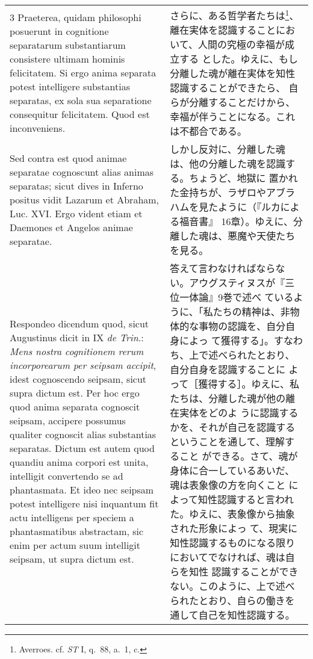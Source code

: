\documentclass[10pt]{jsarticle} %
\begin{document}
\begin{longtable}{p{21em}p{21em}}
\\


3 {\sc Praeterea}, quidam philosophi posuerunt in cognitione
separatarum substantiarum consistere ultimam hominis felicitatem. Si
ergo anima separata potest intelligere substantias separatas, ex sola
sua separatione consequitur felicitatem. Quod est inconveniens.

&

さらに、ある哲学者たちは\footnote{Averroes. cf. {\it ST} I, q.~88,
a.~1, c.}、離在実体を認識することにおいて、人間の究極の幸福が成立する
とした。ゆえに、もし分離した魂が離在実体を知性認識することができたら、
自らが分離することだけから、幸福が伴うことになる。これは不都合である。

\\


{\sc Sed contra est} quod animae separatae cognoscunt alias animas
separatas; sicut dives in Inferno positus vidit Lazarum et Abraham,
Luc. XVI. Ergo vident etiam et Daemones et Angelos animae separatae.

&

しかし反対に、分離した魂は、他の分離した魂を認識する。ちょうど、地獄に
置かれた金持ちが、ラザロやアブラハムを見たように（『ルカによる福音書』
16章）。ゆえに、分離した魂は、悪魔や天使たちを見る。

\\


{\sc Respondeo dicendum} quod, sicut Augustinus dicit in IX {\it de
Trin}.: {\it Mens nostra cognitionem rerum incorporearum per seipsam
accipit}, idest cognoscendo seipsam, sicut supra dictum est. Per hoc
ergo quod anima separata cognoscit seipsam, accipere possumus qualiter
cognoscit alias substantias separatas. Dictum est autem quod quandiu
anima corpori est unita, intelligit convertendo se ad phantasmata. Et
ideo nec seipsam potest intelligere nisi inquantum fit actu
intelligens per speciem a phantasmatibus abstractam, sic enim per
actum suum intelligit seipsam, ut supra dictum est.

&

答えて言わなければならない。アウグスティヌスが『三位一体論』9巻で述べ
ているように、「私たちの精神は、非物体的な事物の認識を、自分自身によっ
て獲得する」。すなわち、上で述べられたとおり、自分自身を認識することに
よって［獲得する］。ゆえに、私たちは、分離した魂が他の離在実体をどのよ
うに認識するかを、それが自己を認識するということを通して、理解すること
ができる。さて、魂が身体に合一しているあいだ、魂は表象像の方を向くこと
によって知性認識すると言われた。ゆえに、表象像から抽象された形象によっ
て、現実に知性認識するものになる限りにおいてでなければ、魂は自らを知性
認識することができない。このように、上で述べられたとおり、自らの働きを
通して自己を知性認識する。


\end{longtable}
\end{document}

